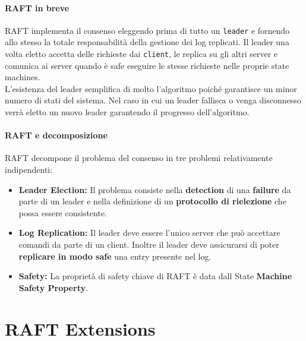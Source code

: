       \paragraph{RAFT in breve}
      RAFT implementa il consenso eleggendo prima di tutto un \texttt{leader} e fornendo allo stesso la totale responsabilità della gestione dei log replicati. Il leader una volta eletto accetta delle richieste dai \texttt{client}, le replica su gli altri server e comunica ai server quando è safe eseguire le stesse richieste nelle proprie state machines.\\
      L'esistenza del leader semplifica di molto l'algoritmo poiché garantisce un minor numero di stati del sistema. Nel caso in cui un leader fallisca o venga disconnesso verrà eletto un nuovo leader garantendo il progresso dell'algoritmo.

      \paragraph{RAFT e decomposizione}
      RAFT decompone il problema del consenso in tre problemi relativamente indipendenti:
      \begin{itemize}
        \item{\textbf{Leader Election:}}
        Il problema consiste nella \textbf{detection} di una \textbf{failure} da parte di un leader e nella definizione di un \textbf{protocollo di rielezione} che possa essere consistente.
        \item{\textbf{Log Replication:}}
        Il leader deve essere l'unico server che può accettare comandi da parte di un client. Inoltre il leader deve assicurarsi di poter \textbf{replicare in modo safe} una entry presente nel log. 
        \item{\textbf{Safety:}}
        La proprietà di safety chiave di RAFT è data dall State \textbf{Machine Safety Property}.
      \end{itemize}

		
		
		
		
	\section{RAFT Extensions}
		
		
		